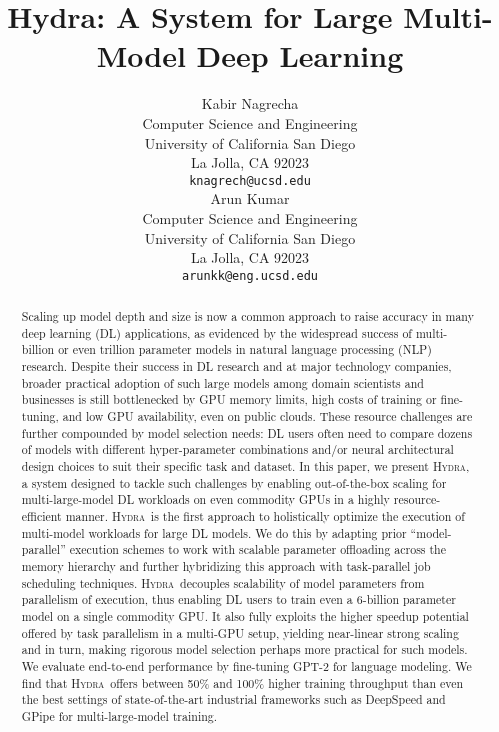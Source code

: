 \documentclass{article}
\title{Hydra: A System for Large Multi-Model Deep Learning}
\author{
 Kabir Nagrecha\\
  Computer Science and Engineering\\
  University of California San Diego\\
  La Jolla, CA 92023 \\
  \texttt{knagrech@ucsd.edu} \\
  \And
  Arun Kumar \\
  Computer Science and Engineering\\
  University of California San Diego\\
  La Jolla, CA 92023 \\
  \texttt{arunkk@eng.ucsd.edu} 
}
\newcommand{\system}{\textsc{Hydra}}
\begin{document}
\maketitle


\begin{abstract}
Scaling up model depth and size is now a common approach to raise accuracy in many deep learning (DL) applications, as evidenced by the widespread success of multi-billion or even trillion parameter models in natural language processing (NLP) research.
Despite their success in DL research and at major technology companies, broader practical adoption of such large models among domain scientists and businesses is still bottlenecked by GPU memory limits, high costs of training or fine-tuning, and low GPU availability, even on public clouds. These resource challenges are further compounded by model selection needs: DL users often need to compare dozens of models with different hyper-parameter combinations and/or neural architectural design choices to suit their specific task and dataset. In this paper, we present \system, a system designed to tackle such challenges by enabling out-of-the-box scaling for multi-large-model DL workloads on even commodity GPUs in a highly resource-efficient manner.
\system~is the first approach to holistically optimize the execution of multi-model workloads for large DL models. We do this by adapting prior ``model-parallel'' execution schemes to work with scalable parameter offloading across the memory hierarchy and further hybridizing this approach with task-parallel job scheduling techniques.
\system~decouples scalability of model parameters from parallelism of execution, thus enabling DL users to train even a 6-billion parameter model on a single commodity GPU. It also fully exploits the higher speedup potential offered by task parallelism in a multi-GPU setup, yielding near-linear strong scaling and in turn, making rigorous model selection perhaps more practical for such models.
We evaluate end-to-end performance by fine-tuning GPT-2 for language modeling. We find that \system~offers between 50\% and 100\% higher training throughput than even the best settings of state-of-the-art industrial frameworks such as DeepSpeed and GPipe for multi-large-model training.
\end{abstract}
\end{document}
